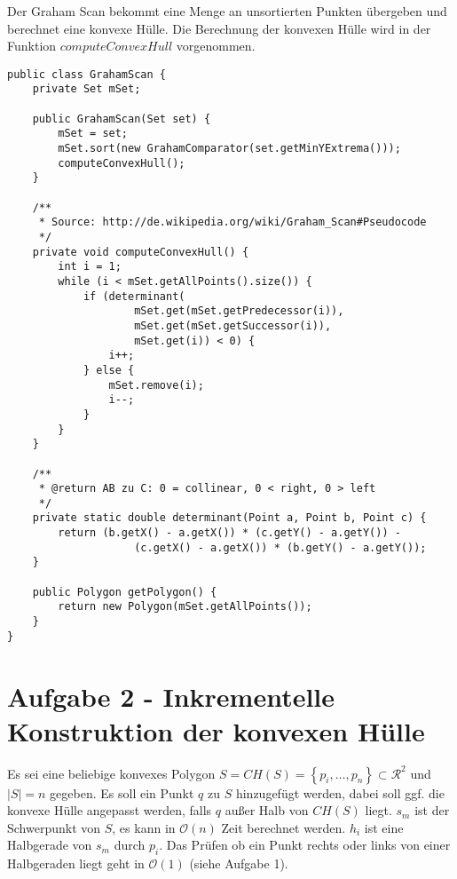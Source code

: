 \documentclass[a4paper]{article}
\begin{document}
Der Graham Scan bekommt eine Menge an unsortierten Punkten übergeben und berechnet eine konvexe Hülle. Die Berechnung der konvexen Hülle wird in der Funktion $computeConvexHull$ vorgenommen.

\begin{lstlisting}
public class GrahamScan {
    private Set mSet;

    public GrahamScan(Set set) {
        mSet = set;
        mSet.sort(new GrahamComparator(set.getMinYExtrema()));
        computeConvexHull();
    }

    /**
     * Source: http://de.wikipedia.org/wiki/Graham_Scan#Pseudocode
     */
    private void computeConvexHull() {
        int i = 1;
        while (i < mSet.getAllPoints().size()) {
            if (determinant(
                    mSet.get(mSet.getPredecessor(i)),
                    mSet.get(mSet.getSuccessor(i)),
                    mSet.get(i)) < 0) {
                i++;
            } else {
                mSet.remove(i);
                i--;
            }
        }
    }

    /**
     * @return AB zu C: 0 = collinear, 0 < right, 0 > left
     */
    private static double determinant(Point a, Point b, Point c) {
        return (b.getX() - a.getX()) * (c.getY() - a.getY()) -
                    (c.getX() - a.getX()) * (b.getY() - a.getY());
    }

    public Polygon getPolygon() {
        return new Polygon(mSet.getAllPoints());
    }
}
\end{lstlisting}


\section*{Aufgabe 2 - Inkrementelle Konstruktion der konvexen Hülle}

Es sei eine beliebige konvexes Polygon $S = CH(S) = \left\{p_i, \dots, p_n\right\} \subset \mathcal{R}^2$ und $|S| = n$ gegeben. Es soll ein Punkt $q$ zu $S$ hinzugefügt werden, dabei soll ggf. die konvexe Hülle angepasst werden, falls $q$ außer Halb von $CH(S)$ liegt. $s_m$ ist der Schwerpunkt von $S$, es kann in $\mathcal{O}(n)$ Zeit berechnet werden. $h_i$ ist eine Halbgerade von $s_m$ durch $p_i$. Das Prüfen ob ein Punkt rechts oder links von einer Halbgeraden liegt geht in $\mathcal{O}(1)$ (siehe Aufgabe 1).
\end{document}
